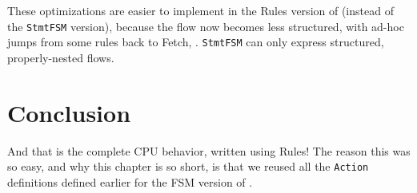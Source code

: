 These optimizations are easier to implement in the Rules version of
{\DRUM} (instead of the \verb|StmtFSM| version), because the flow now
becomes less structured, with ad-hoc jumps from some rules back to
Fetch, {\etc}.  \verb|StmtFSM| can only express structured,
properly-nested flows.




\section{Conclusion}

And that is the complete {\DRUM} CPU behavior, written using Rules!  The
reason this was so easy, and why this chapter is so short, is that we
reused all the \verb|Action| definitions defined earlier for the FSM
version of {\DRUM}.

